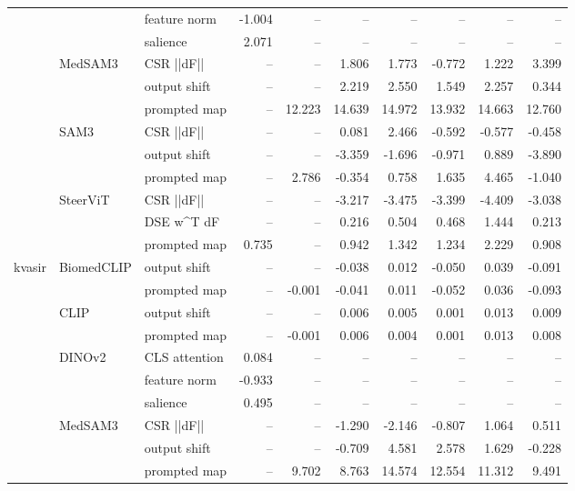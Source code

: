 \begin{tabular}{lllrrrrrrr}
 &  & feature norm & -1.004 & -- & -- & -- & -- & -- & -- \\
 &  & salience & 2.071 & -- & -- & -- & -- & -- & -- \\
\cline{2-10}
 & \multirow[t]{3}{*}{MedSAM3} & CSR  ||dF|| & -- & -- & 1.806 & 1.773 & -0.772 & 1.222 & 3.399 \\
 &  & output shift & -- & -- & 2.219 & 2.550 & 1.549 & 2.257 & 0.344 \\
 &  & prompted map & -- & 12.223 & 14.639 & 14.972 & 13.932 & 14.663 & 12.760 \\
\cline{2-10}
 & \multirow[t]{3}{*}{SAM3} & CSR  ||dF|| & -- & -- & 0.081 & 2.466 & -0.592 & -0.577 & -0.458 \\
 &  & output shift & -- & -- & -3.359 & -1.696 & -0.971 & 0.889 & -3.890 \\
 &  & prompted map & -- & 2.786 & -0.354 & 0.758 & 1.635 & 4.465 & -1.040 \\
\cline{2-10}
 & \multirow[t]{3}{*}{SteerViT} & CSR  ||dF|| & -- & -- & -3.217 & -3.475 & -3.399 & -4.409 & -3.038 \\
 &  & DSE  w^T dF & -- & -- & 0.216 & 0.504 & 0.468 & 1.444 & 0.213 \\
 &  & prompted map & 0.735 & -- & 0.942 & 1.342 & 1.234 & 2.229 & 0.908 \\
\cline{1-10} \cline{2-10}
\multirow[t]{16}{*}{kvasir} & \multirow[t]{2}{*}{BiomedCLIP} & output shift & -- & -- & -0.038 & 0.012 & -0.050 & 0.039 & -0.091 \\
 &  & prompted map & -- & -0.001 & -0.041 & 0.011 & -0.052 & 0.036 & -0.093 \\
\cline{2-10}
 & \multirow[t]{2}{*}{CLIP} & output shift & -- & -- & 0.006 & 0.005 & 0.001 & 0.013 & 0.009 \\
 &  & prompted map & -- & -0.001 & 0.006 & 0.004 & 0.001 & 0.013 & 0.008 \\
\cline{2-10}
 & \multirow[t]{3}{*}{DINOv2} & CLS attention & 0.084 & -- & -- & -- & -- & -- & -- \\
 &  & feature norm & -0.933 & -- & -- & -- & -- & -- & -- \\
 &  & salience & 0.495 & -- & -- & -- & -- & -- & -- \\
\cline{2-10}
 & \multirow[t]{3}{*}{MedSAM3} & CSR  ||dF|| & -- & -- & -1.290 & -2.146 & -0.807 & 1.064 & 0.511 \\
 &  & output shift & -- & -- & -0.709 & 4.581 & 2.578 & 1.629 & -0.228 \\
 &  & prompted map & -- & 9.702 & 8.763 & 14.574 & 12.554 & 11.312 & 9.491 \\

\end{tabular}
